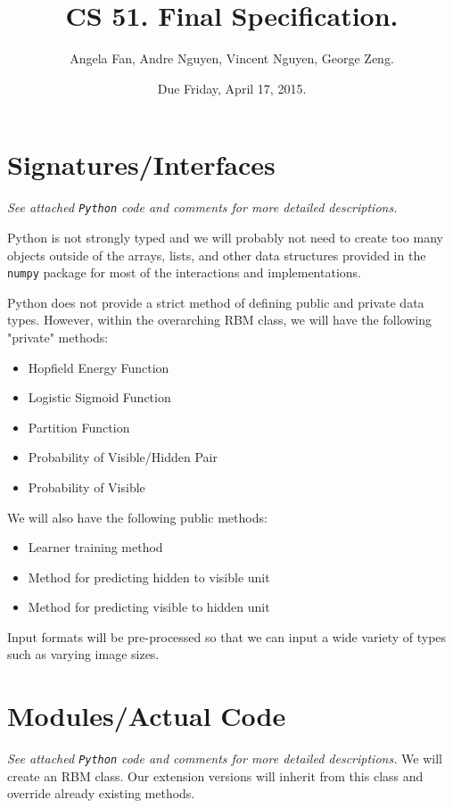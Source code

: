 \documentclass[12pt]{article}
\begin{document}
\title{CS 51. Final Specification.}
\date{Due Friday, April 17, 2015.}
\author{Angela Fan, Andre Nguyen, Vincent Nguyen, George Zeng.} 
\maketitle

\section{Signatures/Interfaces}
\textit{See attached \texttt{Python} code and comments for more detailed descriptions.} 

Python is not strongly typed and we will probably not need to create too many objects outside of the arrays, lists, and other data structures provided in the \texttt{numpy} package for most of the interactions and implementations.

Python does not provide a strict method of defining public and private data types. However, within the overarching RBM class, we will have the following "private" methods:
\begin{itemize}
  \item Hopfield Energy Function
  \item Logistic Sigmoid Function
  \item Partition Function
  \item Probability of Visible/Hidden Pair
  \item Probability of Visible
\end{itemize}

We will also have the following public methods:
\begin{itemize}
  \item Learner training method
  \item Method for predicting hidden to visible unit
  \item Method for predicting visible to hidden unit
\end{itemize}

Input formats will be pre-processed so that we can input a wide variety of types such as varying image sizes.

\section{Modules/Actual Code}
\textit{See attached \texttt{Python} code and comments for more detailed descriptions.} 
We will create an RBM class. Our extension versions will inherit from this class and override already existing methods. 
\end{document}
